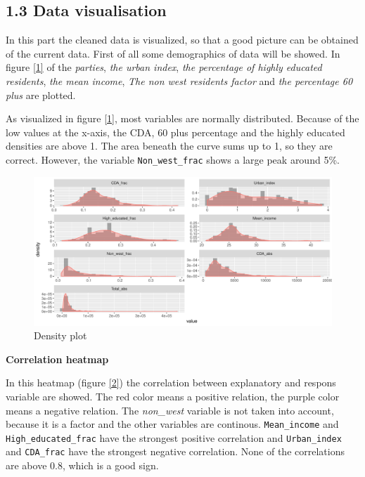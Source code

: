 \documentclass[11pt,]{article}
\begin{document}
\subsection{1.3 Data visualisation}\label{data-visualisation}

In this part the cleaned data is visualized, so that a good picture can
be obtained of the current data. First of all some demographics of data
will be showed. In figure \ref{1} of the \emph{parties}, \emph{the urban
index}, \emph{the percentage of highly educated residents}, \emph{the
mean income}, \emph{The non west residents factor} and \emph{the
percentage 60 plus} are plotted.

As visualized in figure \ref{1}, most variables are normally
distributed. Because of the low values at the x-axis, the CDA, 60 plus
percentage and the highly educated densities are above 1. The area
beneath the curve sums up to 1, so they are correct. However, the
variable \texttt{Non\_west\_frac} shows a large peak around 5\%.

\begin{figure}[H]

{\centering \includegraphics{Report_files/figure-latex/demographics_data-1} 

}

\caption{\label{1} Density plot}\label{fig:demographics_data}
\end{figure}

\textbf{Correlation heatmap}

In this heatmap (figure \ref{2}) the correlation between explanatory and
respons variable are showed. The red color means a positive relation,
the purple color means a negative relation. The \emph{non\_west}
variable is not taken into account, because it is a factor and the other
variables are continous. \texttt{Mean\_income} and
\texttt{High\_educated\_frac} have the strongest positive correlation
and \texttt{Urban\_index} and \texttt{CDA\_frac} have the strongest
negative correlation. None of the correlations are above 0.8, which is a
good sign.
\end{document}
